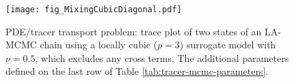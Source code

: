 \begin{figure}
  \centering
  \texttt{[image: fig\_MixingCubicDiagonal.pdf]}
  \caption{PDE/tracer transport problem: trace plot of two states of an LA-MCMC chain using a locally cubic ($p=3$) surrogate model with $\nu = 0.5$, which excludes any cross terms. The additional parameters defined on the last row of Table \ref{tab:tracer-mcmc-parameters}.}
  \label{fig:tracer-mixing-linear}
\end{figure}

  
  
  

  
  

